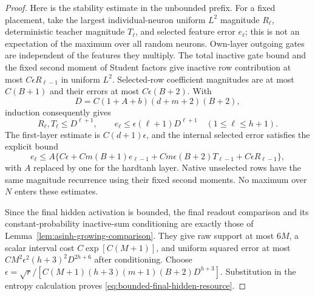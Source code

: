 \begin{proof}
Here is the stability estimate in the unbounded prefix. For a fixed
placement, take the largest individual-neuron uniform $L^2$ magnitude
$R_\ell$, deterministic teacher magnitude $T_\ell$, and selected
feature error $e_\ell$; this is not an expectation of the maximum
over all random neurons. Own-layer outgoing gates are independent of
the features they multiply. The total inactive gate bound and the
fixed second moment of Student factors give inactive row contribution
at most $C\epsilon R_{\ell-1}$ in uniform $L^2$.
Selected-row coefficient magnitudes are at most $C(B+1)$ and their
errors at most $C\epsilon(B+2)$. With
\[
 D=C(1+A+b)(d+m+2)(B+2),
\]
induction consequently gives
\[
 R_\ell,T_\ell\le D^{\ell+1},\qquad
 e_\ell\le\epsilon(\ell+1)D^{\ell+1}
          \quad(1\le\ell\le h+1).
\]
The first-layer estimate is $C(d+1)\epsilon$, and the internal
selected error satisfies the explicit bound
\[
 e_\ell\le A\{C\epsilon+C m(B+1)e_{\ell-1}
       +C m\epsilon(B+2)T_{\ell-1}
       +C\epsilon R_{\ell-1}\},
\]
with $A$ replaced by one for the hardtanh layer. Native unselected
rows have the same magnitude recurrence using their fixed second
moments. No maximum over $N$ enters these estimates.

Since the final hidden activation is bounded, the final readout
comparison and its constant-probability inactive-sum conditioning
are exactly those of Lemma~\ref{lem:asinh-growing-comparison}.
They give raw support at most $6M$, a scalar interval cost
$C\exp[C(M+1)]$, and uniform squared error at most
$C M^2\epsilon^2(h+3)^2D^{2h+6}$ after conditioning.
Choose
$\epsilon=\sqrt r/[C(M+1)(h+3)(m+1)(B+2)D^{h+3}]$.
Substitution in the entropy calculation proves
\eqref{eq:bounded-final-hidden-resource}.
\end{proof}

